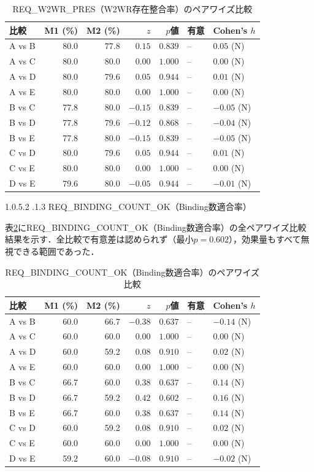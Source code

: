 \documentclass[a4paper,10pt]{jarticle}
\makeatletter
\newcommand{\subsubsubsection}{\@startsection{paragraph}{4}{\z@}%
{1.0\Cvs \@plus.5\Cdp \@minus.2\Cdp}%
{.1\Cvs \@plus.3\Cdp}%
{\reset@font\sffamily\normalsize}
}
\makeatother
\begin{document}
\begin{table}[htbp]
\centering
\caption{REQ\_W2WR\_PRES（W2WR存在整合率）のペアワイズ比較}
\label{tab:stats_w2wr_pres}
\small
\begin{tabular}{lrrrrll}
\toprule
比較 & M1 (\%) & M2 (\%) & $z$ & $p$値 & 有意 & Cohen's $h$ \\
\midrule
A vs B & 80.0 & 77.8 & $0.15$ & $0.839$ & -- & $0.05$ (N) \\
A vs C & 80.0 & 80.0 & $0.00$ & $1.000$ & -- & $0.00$ (N) \\
A vs D & 80.0 & 79.6 & $0.05$ & $0.944$ & -- & $0.01$ (N) \\
A vs E & 80.0 & 80.0 & $0.00$ & $1.000$ & -- & $0.00$ (N) \\
B vs C & 77.8 & 80.0 & $-0.15$ & $0.839$ & -- & $-0.05$ (N) \\
B vs D & 77.8 & 79.6 & $-0.12$ & $0.868$ & -- & $-0.04$ (N) \\
B vs E & 77.8 & 80.0 & $-0.15$ & $0.839$ & -- & $-0.05$ (N) \\
C vs D & 80.0 & 79.6 & $0.05$ & $0.944$ & -- & $0.01$ (N) \\
C vs E & 80.0 & 80.0 & $0.00$ & $1.000$ & -- & $0.00$ (N) \\
D vs E & 79.6 & 80.0 & $-0.05$ & $0.944$ & -- & $-0.01$ (N) \\
\bottomrule
\end{tabular}
\end{table}

\subsubsubsection{REQ\_BINDING\_COUNT\_OK（Binding数適合率）}

表\ref{tab:stats_binding}にREQ\_BINDING\_COUNT\_OK（Binding数適合率）の全ペアワイズ比較結果を示す．全比較で有意差は認められず（最小$p = 0.602$），効果量もすべて無視できる範囲であった．

\begin{table}[htbp]
\centering
\caption{REQ\_BINDING\_COUNT\_OK（Binding数適合率）のペアワイズ比較}
\label{tab:stats_binding}
\small
\begin{tabular}{lrrrrll}
\toprule
比較 & M1 (\%) & M2 (\%) & $z$ & $p$値 & 有意 & Cohen's $h$ \\
\midrule
A vs B & 60.0 & 66.7 & $-0.38$ & $0.637$ & -- & $-0.14$ (N) \\
A vs C & 60.0 & 60.0 & $0.00$ & $1.000$ & -- & $0.00$ (N) \\
A vs D & 60.0 & 59.2 & $0.08$ & $0.910$ & -- & $0.02$ (N) \\
A vs E & 60.0 & 60.0 & $0.00$ & $1.000$ & -- & $0.00$ (N) \\
B vs C & 66.7 & 60.0 & $0.38$ & $0.637$ & -- & $0.14$ (N) \\
B vs D & 66.7 & 59.2 & $0.42$ & $0.602$ & -- & $0.16$ (N) \\
B vs E & 66.7 & 60.0 & $0.38$ & $0.637$ & -- & $0.14$ (N) \\
C vs D & 60.0 & 59.2 & $0.08$ & $0.910$ & -- & $0.02$ (N) \\
C vs E & 60.0 & 60.0 & $0.00$ & $1.000$ & -- & $0.00$ (N) \\
D vs E & 59.2 & 60.0 & $-0.08$ & $0.910$ & -- & $-0.02$ (N) \\
\bottomrule
\end{tabular}
\end{table}
\end{document}
